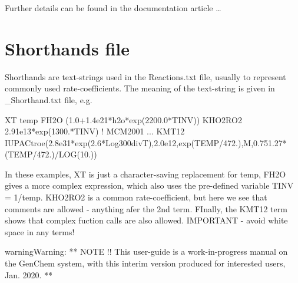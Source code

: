 \documentclass[a4paper,10pt,english]{sphinxmanual}
\begin{document}
Further details can be found in the documentation article …


\section{Shorthands file}
\label{\detokenize{GenChemDoc_chem:shorthands-file}}
Shorthands are text-strings used in the Reactions.txt file, usually to represent commonly used rate-coefficients. The meaning of the text-string is given in \_Shorthand.txt file, e.g.

\begin{sphinxVerbatim}[commandchars=\\\{\}]
XT           temp
FH2O         (1.0+1.4e\PYGZhy{}21*h2o*exp(2200.0*TINV))
KHO2RO2      2.91e\PYGZhy{}13*exp(1300.*TINV) ! MCM2001 ...
KMT12        IUPAC\PYGZus{}troe(2.8e\PYGZhy{}31*exp(2.6*Log300divT),2.0e\PYGZhy{}12,exp(\PYGZhy{}TEMP/472.),M,0.75\PYGZhy{}1.27*(\PYGZhy{}TEMP/472.)/LOG(10.))
\end{sphinxVerbatim}

In these examples, XT is just a character-saving replacement for temp, FH2O gives a more complex expression, which also uses the pre-defined variable TINV = 1/temp. KHO2RO2 is a common rate-coefficient, but here we see that comments are allowed - anything afer the 2nd term. FInally, the KMT12 term shows that complex fuction calls are also allowed. IMPORTANT - avoid white space in any terms!

\begin{sphinxadmonition}{warning}{Warning:}
**  NOTE !!
This user-guide is a work-in-progress manual on the GenChem system,
with this interim version produced for interested users, Jan. 2020.
**
\end{sphinxadmonition}
\end{document}
